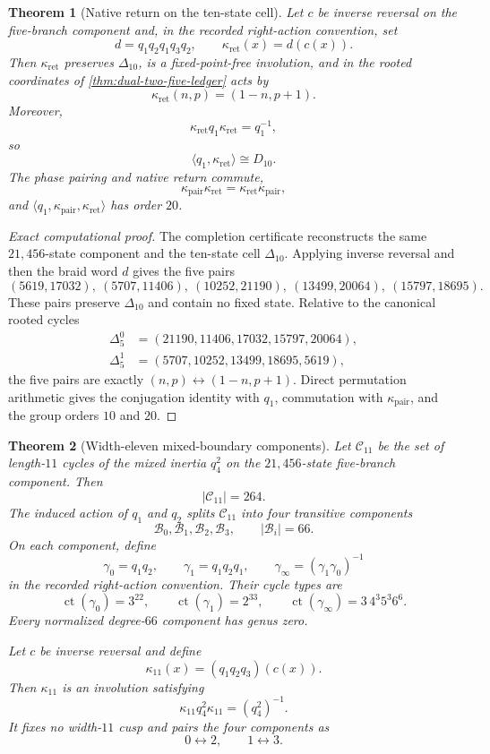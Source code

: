 \documentclass[11pt]{article}
\newtheorem{theorem}{Theorem}[section]
\theoremstyle{remark}
\newcommand{\ct}{\operatorname{ct}}
\begin{document}
\begin{theorem}[Native return on the ten-state cell]\label{thm:ten-state-native-return}
Let $c$ be inverse reversal on the five-branch component and, in the recorded right-action convention, set
\[
 d=q_1q_2q_1q_3q_2,
 \qquad
 \boxed{\kappa_{\mathrm{ret}}(x)=d(c(x)).}
\]
Then $\kappa_{\mathrm{ret}}$ preserves $\Delta_{10}$, is a fixed-point-free involution, and in the rooted coordinates of \cref{thm:dual-two-five-ledger} acts by
\[
 \boxed{\kappa_{\mathrm{ret}}(n,p)=(1-n,p+1).}
\]
Moreover,
\[
 \boxed{\kappa_{\mathrm{ret}}q_1\kappa_{\mathrm{ret}}=q_1^{-1}},
\]
so
\[
 \boxed{\langle q_1,\kappa_{\mathrm{ret}}\rangle\cong D_{10}.}
\]
The phase pairing and native return commute,
\[
 \kappa_{\mathrm{pair}}\kappa_{\mathrm{ret}}
 =\kappa_{\mathrm{ret}}\kappa_{\mathrm{pair}},
\]
and $\langle q_1,\kappa_{\mathrm{pair}},\kappa_{\mathrm{ret}}\rangle$ has order $20$.
\end{theorem}

\begin{proof}[Exact computational proof]
The completion certificate reconstructs the same $21{,}456$-state component and the ten-state cell $\Delta_{10}$.  Applying inverse reversal and then the braid word $d$ gives the five pairs
\[
 (5619,17032),\ (5707,11406),\ (10252,21190),\
 (13499,20064),\ (15797,18695).
\]
These pairs preserve $\Delta_{10}$ and contain no fixed state.  Relative to the canonical rooted cycles
\[
\begin{aligned}
 \Delta_5^0&=(21190,11406,17032,15797,20064),\\
 \Delta_5^1&=(5707,10252,13499,18695,5619),
\end{aligned}
\]
the five pairs are exactly $(n,p)\leftrightarrow(1-n,p+1)$.  Direct permutation arithmetic gives the conjugation identity with $q_1$, commutation with $\kappa_{\mathrm{pair}}$, and the group orders $10$ and $20$.
\end{proof}

\begin{theorem}[Width-eleven mixed-boundary components]\label{thm:width-eleven-boundary}
Let $\mathcal C_{11}$ be the set of length-$11$ cycles of the mixed inertia $q_4^2$ on the $21{,}456$-state five-branch component.  Then
\[
 \boxed{|\mathcal C_{11}|=264.}
\]
The induced action of $q_1$ and $q_2$ splits $\mathcal C_{11}$ into four transitive components
\[
 \mathcal B_0,\mathcal B_1,\mathcal B_2,\mathcal B_3,
 \qquad
 |\mathcal B_i|=66.
\]
On each component, define
\[
 \gamma_0=q_1q_2,
 \qquad
 \gamma_1=q_1q_2q_1,
 \qquad
 \gamma_\infty=(\gamma_1\gamma_0)^{-1}
\]
in the recorded right-action convention.  Their cycle types are
\[
 \boxed{
 \ct(\gamma_0)=3^{22},\qquad
 \ct(\gamma_1)=2^{33},\qquad
 \ct(\gamma_\infty)=3\,4^3 5^3 6^6.
 }
\]
Every normalized degree-$66$ component has genus zero.

Let $c$ be inverse reversal and define
\[
 \boxed{\kappa_{11}(x)=(q_1q_2q_3)(c(x)).}
\]
Then $\kappa_{11}$ is an involution satisfying
\[
 \boxed{\kappa_{11}q_4^2\kappa_{11}=(q_4^2)^{-1}.}
\]
It fixes no width-$11$ cusp and pairs the four components as
\[
 \boxed{0\leftrightarrow2,\qquad1\leftrightarrow3.}
\]
\end{theorem}
\end{document}

